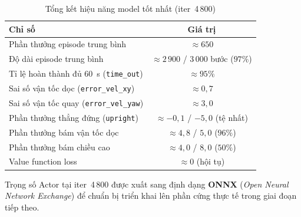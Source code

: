 \begin{table}[H]
    \centering
    \caption{Tổng kết hiệu năng model tốt nhất (iter~4\,800)}
    \label{tab:best_model}
    \renewcommand{\arraystretch}{1.3}
    \begin{tabular}{lc}
        \toprule
        \textbf{Chỉ số} & \textbf{Giá trị} \\
        \midrule
        Phần thưởng episode trung bình                  & $\approx 650$ \\
        Độ dài episode trung bình                       & $\approx 2\,900$ / 3\,000 bước ($97\%$) \\
        Tỉ lệ hoàn thành đủ 60~s (\texttt{time\_out})  & $\approx 95\%$ \\
        Sai số vận tốc dọc (\texttt{error\_vel\_xy})    & $\approx 0{,}7$ \\
        Sai số vận tốc quay (\texttt{error\_vel\_yaw})  & $\approx 3{,}0$ \\
        Phần thưởng thẳng đứng (\texttt{upright})      & $\approx -0{,}1$ / $-5{,}0$ (tệ nhất) \\
        Phần thưởng bám vận tốc dọc                    & $\approx 4{,}8$ / $5{,}0$ ($96\%$) \\
        Phần thưởng bám chiều cao                      & $\approx 4{,}0$ / $8{,}0$ ($50\%$) \\
        Value function loss                            & $\approx 0$ (hội tụ) \\
        \bottomrule
    \end{tabular}
\end{table}

Trọng số Actor tại iter~4\,800 được xuất sang định dạng \textbf{ONNX}
(\textit{Open Neural Network Exchange}) để chuẩn bị triển khai lên phần cứng
thực tế trong giai đoạn tiếp theo.
